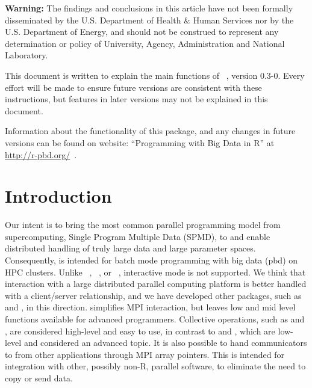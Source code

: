 
{\color{red} \bf Warning:}
The findings and conclusions in this article have not been
formally disseminated by the U.S. Department of Health \& Human Services
nor by the U.S. Department of Energy,
and should not be construed to represent any determination or
policy of University, Agency, Administration and National Laboratory.

This document is written to explain the main
functions of ~\citep{Chen2012}, version 0.3-0.
Every effort will be made to ensure future versions are consistent with
these instructions, but features in later versions may not be explained
in this document.

Information about the functionality of this package,
and any changes in future versions can be found on website:
``Programming with Big Data in R'' at
\url{http://r-pbd.org/}~\citep{pbdR2012}.




\section[Introduction]{Introduction}
\label{sec:introduction}

Our intent is to bring the most common parallel programming model from
supercomputing, Single Program Multiple Data (SPMD), to 
and enable distributed handling of truly large data and large parameter
spaces. Consequently,
 is intended for batch mode programming with big data
(pbd) on HPC clusters. Unlike ~\citep{Yu2002},
~\citep{Tierney2012}, or ~\citep{Rcore},
interactive mode is not supported.  We think that interaction with a
large distributed parallel computing platform is better handled with a
client/server relationship, and we have developed other packages, such as
 and , in
this direction.   simplifies MPI interaction, but leaves
low and mid level functions available for advanced programmers. Collective
operations, such as  and , are considered
high-level and easy to use, in contrast to  and ,
which are low-level and
considered an advanced topic. It is also possible to hand communicators to
 from other applications through MPI array pointers. This is 
intended for integration with other, possibly non-R, parallel software, to
eliminate the need to copy or send data.

